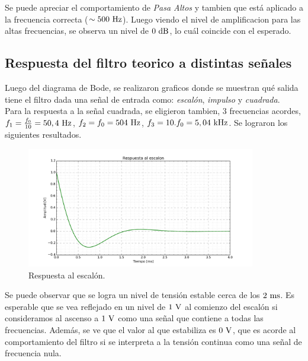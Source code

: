 Se puede apreciar el comportamiento de \textit{Pasa Altos} y tambien que est\'a aplicado a la frecuencia correcta ($\sim 500\ \si{\hertz}$). Luego viendo el nivel de amplificacion para las altas frecuencias, se observa un nivel de $0 \dB$, lo cu\'al coincide con el esperado.

\subsection*{Respuesta del filtro teorico a distintas señales}

Luego del diagrama de Bode, se realizaron graficos donde se muestran qu\'e salida tiene el filtro dada una señal de entrada como: \textit{escal\'on}, \textit{impulso} y \textit{cuadrada}.\\

Para la respuesta a la señal cuadrada, se eligieron tambien,  3 frecuencias acordes, $f_1 = \frac{f_0}{10}=50,4 \ \si{\hertz}$, $f_2 = f_0 = 504\ \si{\hertz}$, $f_3 = 10.f_0= 5,04 \ \si{\kilo\hertz}$.
Se lograron los siguientes resultados.\\


\begin{figure}[hbt]
	\centering
	\includegraphics[width=10cm]{imagenes/Step}
	\caption{Respuesta al escal\'on.}
\end{figure}
Se puede observar que se logra un nivel de tensi\'on estable cerca de los $2 \ \si{\milli\second}$. Es esperable que se vea reflejado en un nivel de $1\ \si{\volt}$ al comienzo del escal\'on si consideramos al ascenso a $1\ \si{\volt}$  como una señal que contiene a todas las frecuencias. Adem\'as, se ve que el valor al que estabiliza es $0 \ \si{\volt}$, que es acorde al comportamiento del filtro si se interpreta a la tensi\'on continua como una señal de frecuencia nula.\\

